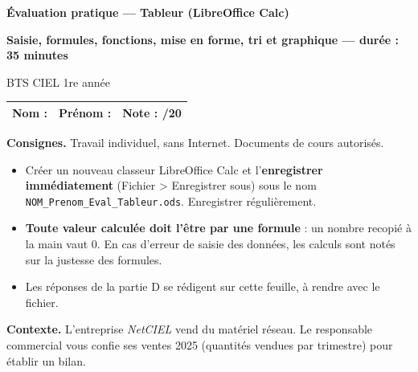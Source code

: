 \documentclass[10pt,a4paper]{article}
\newif\ifcorrige
\providecommand{\sujet}{A}
\newcommand{\menu}[1]{\textsf{\small #1}}               %
\begin{document}
\begin{center}
  {\Large\bfseries Évaluation pratique — Tableur (LibreOffice Calc)\par}
  \vspace{1pt}
  {\bfseries Saisie, formules, fonctions, mise en forme, tri et graphique — durée : 35 minutes\par}
  \vspace{2pt}
  BTS CIEL 1re année \qquad \fbox{\large\bfseries SUJET \sujet}
  \ifcorrige\par\vspace{2pt}{\large\bfseries\color{corr}CORRIGÉ ET BARÈME — document enseignant}\fi
\end{center}

\vspace{-2pt}
{\renewcommand{\arraystretch}{1.5}
\begin{tabularx}{\linewidth}{|X|X|p{2.2cm}|}
\hline
\textbf{Nom :} & \textbf{Prénom :} & \textbf{Note :} \hfill /20 \\ \hline
\end{tabularx}}

\begin{cdc}
\textbf{Consignes.} Travail individuel, sans Internet. Documents de cours autorisés.
\begin{itemize}
  \item Créer un nouveau classeur LibreOffice Calc et l'\textbf{enregistrer immédiatement} (\menu{Fichier > Enregistrer sous})
        sous le nom \texttt{NOM\_Prenom\_Eval\_Tableur.ods}. Enregistrer régulièrement.
  \item \textbf{Toute valeur calculée doit l'être par une formule} : un nombre recopié à la main vaut 0.
        En cas d'erreur de saisie des données, les calculs sont notés sur la justesse des formules.
  \item Les réponses de la partie D se rédigent sur cette feuille, à rendre avec le fichier.
\end{itemize}
\end{cdc}

\textbf{Contexte.} L'entreprise \emph{NetCIEL} vend du matériel réseau. Le responsable commercial vous confie
ses ventes 2025 (quantités vendues par trimestre) pour établir un bilan.
\end{document}
